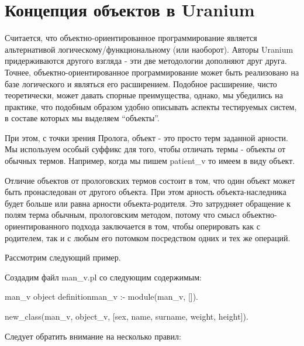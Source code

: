 \documentclass[a4paper]{book}
\def\ur{Uranium}
\begin{document}
\section{Концепция объектов в \ur}
Считается, что объектно-ориентированное программирование является
альтернативой логическому/функциональному (или наоборот). Авторы
\ur{} придерживаются другого взгляда - эти две методологии
дополняют друг друга. Точнее, объектно-ориентированное
программирование может быть реализовано на базе логического и
являться его расширением. Подобное расширение, чисто
теоретически, может давать спорные преимущества, однако, мы
убедились на практике, что подобным образом удобно описывать
аспекты тестируемых систем, в составе которых мы выделяем
``объекты''. 

При этом, с точки зрения Пролога, объект - это просто терм
заданной арности. Мы используем особый суффикс для того, чтобы
отличать термы - объекты от обычных термов. Например, когда мы
пишем patient\_v то имеем в виду объект. 

Отличие объектов от прологовских термов состоит в том, что один
объект может быть пронаследован от другого объекта. При этом
арность объекта-наследника будет больше или равна арности
объекта-родителя. Это затрудняет обращение к полям терма обычным,
прологовским методом, потому что смысл объектно-ориентированного
подхода заключается в том, чтобы оперировать как с родителем, так
и с любым его потомком посредством одних и тех же операций.

Рассмотрим следующий пример.

Создадим файл man\_v.pl со следующим содержимым:

\begin{example}{man\_v object definition}{man_v}
:- module(man_v, []).

new_class(man_v, object_v, 
          [sex, name, surname, weight, height]).
\end{example}

Следует обратить внимание на несколько правил:
\end{document}

